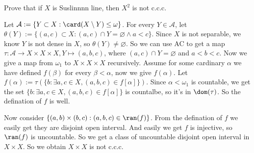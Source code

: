 \documentclass{ctexart}
\begin{document}
\begin{problem}
   Prove that if \(X\) is Suslinnnn line, then \(X^2\) is not c.c.c.
\end{problem}

\begin{solution}
  Let \(\mathcal{A}:=\{Y \subset X:\card (X\setminus Y) \leq\omega\}\). 
  For every \(Y \in \mathcal{A}\), let \(\theta(Y):=\{(a,c) \subset X:(a,c) \cap Y =\varnothing \wedge a<c\}\). 
  Since \(X\) is not separable, we know \(Y\) is not dense in \(X\), so \(\theta(Y) \neq \varnothing\).
  So we can use AC to get a map \(\tau:\mathcal{A} \to X \times X \times X,Y \mapsto (a,b,c)\), where \((a,c) \cap Y = \varnothing\) and \(a<b<c\). 
  Now we give a map from \(\omega_1\) to \(X \times X \times X\) recursively. 
  Assume for some cardinary \(\alpha\) we have defined \(f(\beta)\) for every \(\beta<\alpha\), now we give \(f(\alpha)\). 
  Let \(f(\alpha):=\tau(\{b:\exists a,c \in X,(a,b,c) \in f[\alpha]\})\). 
  Since \(\alpha<\omega_1\) is countable, we get the set \(\{b:\exists a,c \in X,(a,b,c) \in f[\alpha]\}\) is countalbe, so it's in \(\dom(\tau)\). 
  So the defination of \(f\) is well. 

  Now consider \(\{(a,b)\times(b,c):(a,b,c) \in \ran(f)\}\). From the defination of \(f\) we easily get they are disjoint open interval. 
  And easily we get \(f\) is injective, so \(\ran(f)\) is uncountable. So we get a class of uncountable disjoint open interval in \(X \times X\). 
  So we obtain \(X \times X \) is not c.c.c.
\end{solution}
\end{document}

